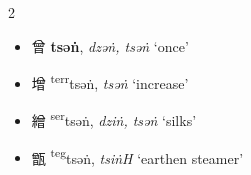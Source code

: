 \begin{multicols}{2}

\medskip

\begin{minipage}{\columnwidth}
\begin{itemize}[leftmargin=*, labelsep=0.5em]  
    \item {\Large{曾}} %
    {\large{\textbf{tsəṅ}}},
    \textit{dzəṅ, tsəṅ} `once' %

    \item {\Large{增}} %
    {\large{{\textsuperscript{terr}}tsəṅ}},
    \textit{tsəṅ} `increase' %





    \item {\Large{繒}} %
    {\large{{\textsuperscript{ser}}tsəṅ}},
    \textit{dziṅ, tsəṅ} `silks' %



    \item {\Large{甑}} %
    {\large{{\textsuperscript{teg}}tsəṅ}},
    \textit{tsiṅH} `earthen steamer' %

\end{itemize}
\end{minipage}


\end{multicols}
